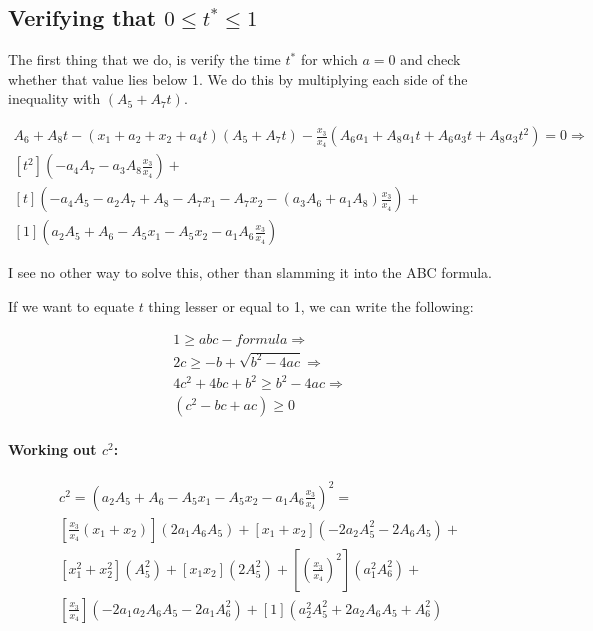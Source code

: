 \documentclass{article}
\begin{document}
\subsection{Verifying that $0 \le t^* \le 1$}

The first thing that we do, is verify the time $t^*$ for which $a=0$ and check whether that value lies below 1. We do this by multiplying each side of the inequality with $(A_5 + A_7 t)$.

\begin{align*}
     A_6 + A_8 t - (x_1 + a_2 + x_2 + a_4t)(A_5 + A_7 t) - \frac{x_3}{x_4} (A_6 a_1 + A_8 a_1 t + A_6 a_3 t + A_8 a_3 t^2) = 0  \Rightarrow \\
     [t^2](- a_4 A_7 - a_3 A_8 \frac{x_3}{x_4}) + \\
     [t] (- a_4A_5 - a_2A_7+ A_8- A_7 x_1 - A_7 x_2 - (a_3A_6 + a_1 A_8)\frac{x_3}{x_4}) + \\
     [1] (a_2 A_5 + A_6- A_5x_1  - A_5x_2  - a_1A_6 \frac{x_3}{x_4})
\end{align*}

I see no other way to solve this, other than slamming it into the ABC formula.




If we want to equate $t$ thing lesser or equal to 1, we can write the following:

\begin{align*}
     1 \ge abc-formula \Rightarrow \\
    2c \ge -b + \sqrt{b^2 - 4 ac} \Rightarrow \\
    4c^2 + 4bc + b^2 \ge b^2 - 4 ac \Rightarrow \\
    (c^2 - bc + ac) \ge 0 
\end{align*}

\paragraph*{Working out $c^2$:}

\begin{align*}
    c^2 = \left(a_2 A_5 + A_6- A_5x_1  - A_5x_2  - a_1A_6 \frac{x_3}{x_4} \right)^2 = \\
    \left[\frac{x_3}{x_4}(x_1 + x_2)\right]( 2 a_1 A_6 A_5) + 
    [x_1 + x_2](- 2 a_2 A_5^2 - 2 A_6 A_5) +\\
    [x_1^2 + x_2^2](A_5^2) +
    [x_1x_2](2A_5^2) +
   \left [\left( \frac{x_3}{x_4} \right)^2 \right](a_1^2 A_6^2) + \\
    \left[\frac{x_3}{x_4}\right]( - 2 a_1 a_2 A_6 A_5  - 2 a_1 A_6^2) +
    [1](a_2^2 A_5^2+ 2 a_2 A_6 A_5+ A_6^2)
\end{align*}
\end{document}
